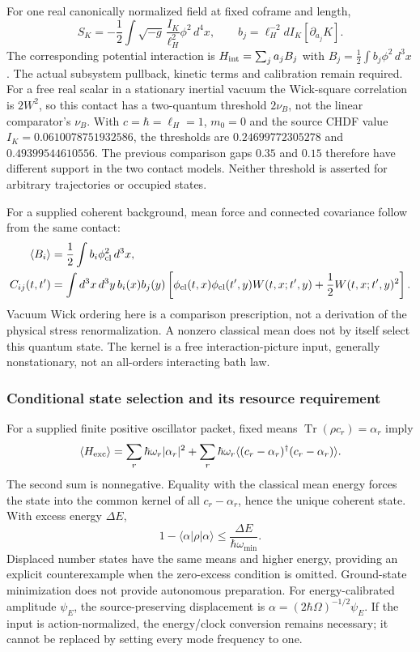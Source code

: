 \documentclass[11pt]{article}
\begin{document}
For one real canonically normalized field at fixed coframe and length,
\begin{equation}
 S_K=-\frac12\int \sqrt{-g}\,\frac{I_K}{\ell_H^2}\phi^2\,d^4x,
 \qquad b_j=\ell_H^{-2}dI_K[\partial_{a_j}K].
\end{equation}
The corresponding potential interaction is
$H_{\rm int}=\sum_j a_j B_j$ with
$B_j=\frac12\int b_j\phi^2\,d^3x$. The actual subsystem pullback,
kinetic terms and calibration remain required. For a free real scalar in
a stationary inertial vacuum the Wick-square correlation is $2W^2$,
so this contact has a two-quantum threshold $2\nu_B$, not the linear
comparator's $\nu_B$. With $c=\hbar=\ell_H=1$, $m_0=0$ and the
source CHDF value $I_K=0.0610078751932586$, the thresholds are
$0.24699772305278$ and $0.49399544610556$. The previous comparison gaps
$0.35$ and $0.15$ therefore have different support in the two contact models.
Neither threshold is asserted for arbitrary trajectories or occupied states.

For a supplied coherent background, mean force and connected covariance
follow from the same contact:
\begin{align}
 \langle B_i\rangle&=\frac12\int b_i\phi_{\rm cl}^2\,d^3x,\\
 C_{ij}(t,t')&=\int d^3x\,d^3y\,b_i(x)b_j(y)
 \left[\phi_{\rm cl}(t,x)\phi_{\rm cl}(t',y)W(t,x;t',y)
 +\frac12 W(t,x;t',y)^2\right].
\end{align}
Vacuum Wick ordering here is a comparison prescription, not a derivation
of the physical stress renormalization. A nonzero classical mean does not
by itself select this quantum state. The kernel is a free interaction-picture
input, generally nonstationary, not an all-orders interacting bath law.

\subsubsection{Conditional state selection and its resource requirement}
For a supplied finite positive oscillator packet, fixed means
$\operatorname{Tr}(\rho c_r)=\alpha_r$ imply
\begin{equation}
 \langle H_{\rm exc}\rangle=
 \sum_r\hbar\omega_r|\alpha_r|^2+
 \sum_r\hbar\omega_r
 \langle(c_r-\alpha_r)^\dagger(c_r-\alpha_r)\rangle.
\end{equation}
The second sum is nonnegative. Equality with the classical mean energy
forces the state into the common kernel of all $c_r-\alpha_r$, hence the
unique coherent state. With excess energy $\Delta E$,
\begin{equation}
 1-\langle\alpha|\rho|\alpha\rangle
 \leq \frac{\Delta E}{\hbar\omega_{\min}}.
\end{equation}
Displaced number states have the same means and higher energy, providing
an explicit counterexample when the zero-excess condition is omitted.
Ground-state minimization does not provide autonomous preparation.
For energy-calibrated amplitude $\psi_E$, the source-preserving displacement
is $\alpha=(2\hbar\Omega)^{-1/2}\psi_E$. If the input is action-normalized,
the energy/clock conversion remains necessary; it cannot be replaced by
setting every mode frequency to one.
\end{document}

